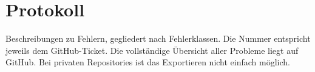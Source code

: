 %



\newpage



\section{Protokoll}
\label{Abschnitt:Programmfehler:Protokoll}

Beschreibungen zu Fehlern, gegliedert nach Fehlerklassen. Die Nummer entspricht jeweils dem GitHub-Ticket. Die vollständige Übersicht aller Probleme liegt auf GitHub. Bei privaten Repositories ist das Exportieren nicht einfach möglich.\\


